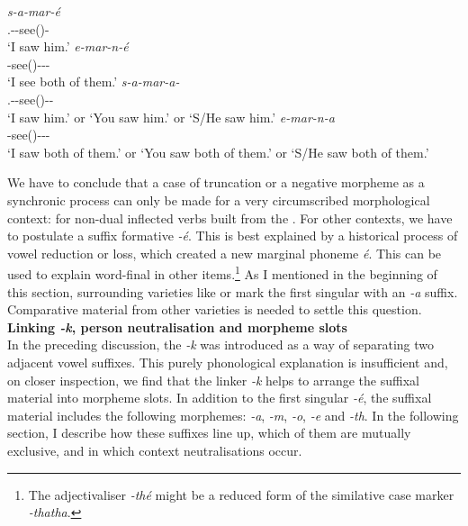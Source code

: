 \begin{exe}
\ex
\begin{xlist}
	\ex
	\gll \emph{s-a-mar-é}\\
	\Tsg.\Masc-\Ndu-see(\Rs)-\Fnsg\\
	\trans `I saw him.'
	\label{ex207}
	\ex
	\gll \emph{e-mar-n-é}\\
	\Stnsg-see(\Ext)-\Ndu-\Pst-\Sg\\
	\trans `I see both of them.'
	\label{ex206}
	\ex
	\gll \emph{s-a-mar-a-\Zero{}}\\
	\Tsg.\Masc-\Ndu-see(\Rs)-\Pst-\Sg\\
	\trans `I saw him.' or `You saw him.' or `S/He saw him.'
	\label{ex208}
	\ex
	\gll \emph{e-mar-n-a}\\
	\Stnsg-see(\Ext)-\Ndu-\Pst-\Sg\\
	\trans `I saw both of them.' or `You saw both of them.' or `S/He saw both of them.'
	\label{ex209}
\end{xlist}
\end{exe}

We have to conclude that a case of truncation or a negative morpheme as a synchronic process can only be made for a very circumscribed morphological context: for non-dual inflected verbs built from the . For other contexts, we have to postulate a suffix formative \emph{-é}. This is best explained by a historical process of vowel reduction or  loss, which created a new marginal phoneme \emph{é}. This can be used to explain word-final  in other items.\footnote{The adjectivaliser \emph{-thé} might be a reduced form of the similative case marker \emph{-thatha}.} As I mentioned in the beginning of this section, surrounding varieties like  or  mark the first  singular with an \emph{-a} suffix. Comparative material from other  varieties is needed to settle this question.\\

\noindent
\textbf{Linking \emph{-k}, person neutralisation and morpheme slots}\\

In the preceding discussion, the  \emph{-k} was introduced as a way of separating two adjacent vowel suffixes. This purely phonological explanation is insufficient and, on closer inspection, we find that the linker \emph{-k} helps to arrange the suffixal material into morpheme slots. In addition to the first singular \emph{-é}, the suffixal material includes the following morphemes:  \emph{-a},  \emph{-m},  \emph{-o}, \Fnsg{} \emph{-e} and \Stnsg{} \emph{-th}. In the following section, I describe how these suffixes line up, which of them are mutually exclusive, and in which context  neutralisations occur.\\

